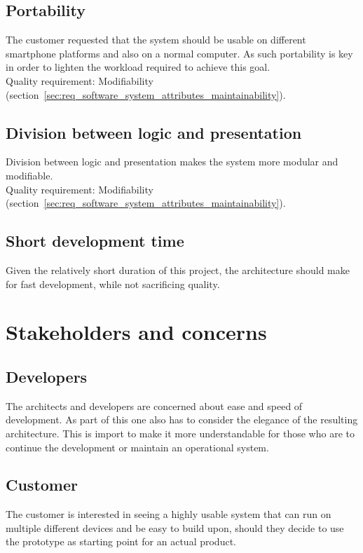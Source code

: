\documentclass[11pt]{book}
\begin{document}
\subsection{Portability}
The customer requested that the system should be usable on different smartphone platforms and also on a normal computer. As such portability is key in order to lighten the workload required to achieve this goal.\\
Quality requirement: Modifiability (section~\ref{sec:req_software_system_attributes_maintainability}).

\subsection{Division between logic and presentation}
Division between logic and presentation makes the system more modular and modifiable.\\
Quality requirement: Modifiability (section~\ref{sec:req_software_system_attributes_maintainability}).

\subsection{Short development time}
Given the relatively short duration of this project, the architecture should make for fast development, while not sacrificing quality.

\section{Stakeholders and concerns}

\subsection{Developers}
The architects and developers are concerned about ease and speed of development. As part of this one also has to consider the elegance of the resulting architecture. This is import to make it more understandable for those who are to continue the development or maintain an operational system.

\subsection{Customer}
The customer is interested in seeing a highly usable system that can run on multiple different devices and be easy to build upon, should they decide to use the prototype as starting point for an actual product.
\end{document}
